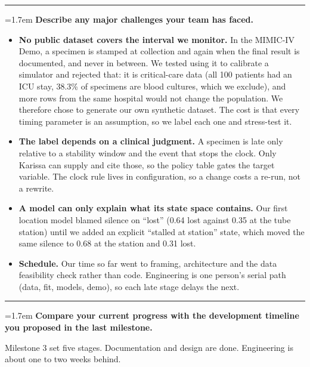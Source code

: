 \documentclass[10pt]{article}
\newcommand{\qa}[2]{%
  \par\Needspace{6\baselineskip}\addvspace{0.75em}%
  {\color{hair}\rule{\textwidth}{0.5pt}}\par\nopagebreak\vspace{0.15em}%
  \noindent\hangindent=1.7em\hangafter=1
  {\sffamily\bfseries\color{tracerteal}\makebox[1.7em][l]{#1}\color{black}#2}\par\nopagebreak\vspace{0.1em}}
\begin{document}
\qa{4.}{Describe any major challenges your team has faced.}
\begin{itemize}
\item \textbf{No public dataset covers the interval we monitor.} In the MIMIC-IV Demo, a specimen is stamped at
  collection and again when the final result is documented, and never in between. We tested using it to
  calibrate a simulator and rejected that: it is critical-care data (all 100 patients had an ICU stay, 38.3\%
  of specimens are blood cultures, which we exclude), and more rows from the same hospital would not change the
  population. We therefore chose to generate our own synthetic dataset. The cost is that every timing
  parameter is an assumption, so we label each one and stress-test it.
\item \textbf{The label depends on a clinical judgment.} A specimen is late only relative to a stability window
  and the event that stops the clock. Only Karissa can supply and cite those, so the policy table gates the
  target variable. The clock rule lives in configuration, so a change costs a re-run, not a rewrite.
\item \textbf{A model can only explain what its state space contains.} Our first location model blamed silence on
  ``lost'' (0.64 lost against 0.35 at the tube station) until we added an explicit ``stalled at station''
  state, which moved the same silence to 0.68 at the station and 0.31 lost.
\item \textbf{Schedule.} Our time so far went to framing, architecture and the data feasibility check rather than
  code. Engineering is one person's serial path (data, fit, models, demo), so each late stage delays the next.
\end{itemize}

\qa{5.}{Compare your current progress with the development timeline you proposed in the last milestone.}
Milestone 3 set five stages. Documentation and design are done. Engineering is about one to two weeks behind.
\end{document}
